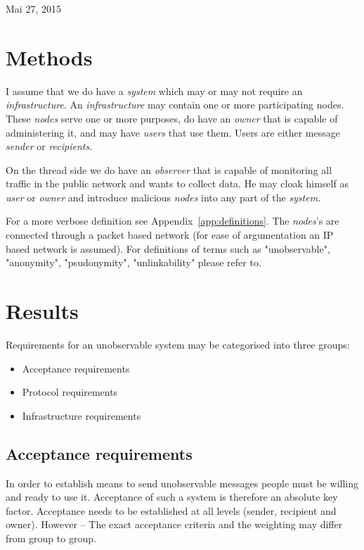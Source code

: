 \documentclass[12pt,journal,compsoc]{IEEEtran}
\begin{document}
\hfill Mai 27, 2015
\fi

\section{Methods}
I assume that we do have a \emph{system} which may or may not require an \emph{infrastructure}. An \emph{infrastructure} may contain one or more participating {nodes}. These \emph{nodes} serve one or more purposes, do have an \emph{owner} that is capable of administering it, and may have \emph{users} that use them. Users are either message \emph{sender} or \emph{recipients}.
\par
On the thread side we do have an \emph{observer} that is capable of monitoring all traffic in the public network and wants to collect data. He may cloak himself as \emph{user} or \emph{owner} and introduce malicious \emph{nodes} into any part of the \emph{system}.
\par
For a more verbose definition see Appendix~\ref{app:definitions}. The \emph{nodes}'s are connected through a packet based network (for ease of argumentation an IP based network is assumed). For definitions of terms such as "unobservable", "anonymity", "psudonymity", "unlinkability" please refer to\cite{pfitzmann2010terminology}.


\section{Results}
Requirements for an unobservable system may be categorised into three groups:
\begin{itemize}
	\item Acceptance requirements
	\item Protocol requirements
	\item Infrastructure requirements
\end{itemize}

\subsection{Acceptance requirements}
In order to establish means to send unobservable messages people must be willing and ready to use it. Acceptance of such a system is therefore an absolute key factor. Acceptance needs to be established at all levels (sender, recipient and owner). However -- The exact acceptance criteria and the weighting may differ from group to group.
\end{document}

